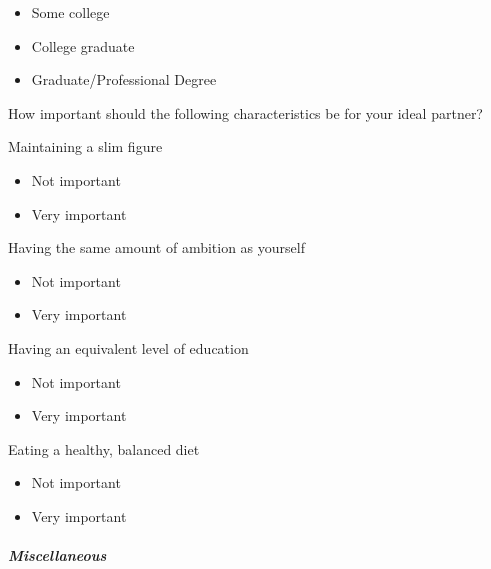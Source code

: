 \documentclass[twoside]{report}
\begin{document}
\begin{multicols*}{2}
\begin{multicols}{2}
\begin{itemize}
  \begin{itemize}
  \item
    Some college
  \item
    College graduate
  \item
    Graduate/Professional Degree
  \end{itemize}
\end{itemize}

How important should the following characteristics be for your ideal
partner?

Maintaining a slim figure

\begin{itemize}
\item
  Not important
\end{itemize}

\begin{itemize}
\item
  Very important
\end{itemize}

Having the same amount of ambition as yourself

\begin{itemize}
\item
  Not important
\end{itemize}

\begin{itemize}
\item
  Very important
\end{itemize}

Having an equivalent level of education

\begin{itemize}
\item
  Not important
\end{itemize}

\begin{itemize}
\item
  Very important
\end{itemize}

Eating a healthy, balanced diet

\begin{itemize}
\item
  Not important
\end{itemize}

\begin{itemize}
\item
  Very important
\end{itemize}

\subparagraph{Miscellaneous}


\end{multicols}
\end{multicols*}
\end{document}
